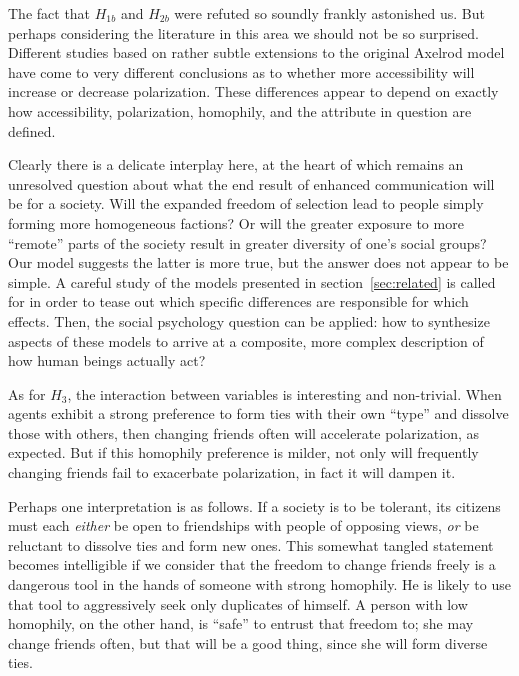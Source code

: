
The fact that $H_{1b}$ and $H_{2b}$ were refuted so soundly frankly astonished
us. But perhaps considering the literature in this area we should not be so
surprised. Different studies based on rather subtle extensions to the original
Axelrod model have come to very different conclusions as to whether more
accessibility will increase or decrease polarization. These differences appear
to depend on exactly how accessibility, polarization, homophily, and the
attribute in question are defined.

Clearly there is a delicate interplay here, at the heart of which remains an
unresolved question about what the end result of enhanced communication will
be for a society. Will the expanded freedom of selection lead to people
simply forming more homogeneous factions? Or will the greater exposure to
more ``remote'' parts of the society result in greater diversity of one's
social groups? Our model suggests the latter is more true, but the answer does
not appear to be simple. A careful study of the models presented in
section~\ref{sec:related} is called for in order to tease out which specific
differences are responsible for which effects. Then, the social psychology
question can be applied: how to synthesize aspects of these models to arrive
at a composite, more complex description of how human beings actually act?

As for $H_3$, the interaction between variables is interesting and
non-trivial. When agents exhibit a strong preference to form ties with their
own ``type'' and dissolve those with others, then changing friends often will
accelerate polarization, as expected. But if this homophily preference is
milder, not only will frequently changing friends fail to exacerbate
polarization, in fact it will dampen it.

Perhaps one interpretation is as follows. If a society is to be tolerant, its
citizens must each \textit{either} be open to friendships with people of
opposing views, \textit{or} be reluctant to dissolve ties and form new ones.
This somewhat tangled statement becomes intelligible if we consider that the
freedom to change friends freely is a dangerous tool in the hands of someone
with strong homophily. He is likely to use that tool to aggressively seek only
duplicates of himself. A person with low homophily, on the other hand, is
``safe'' to entrust that freedom to; she may change friends often, but that
will be a good thing, since she will form diverse ties.
